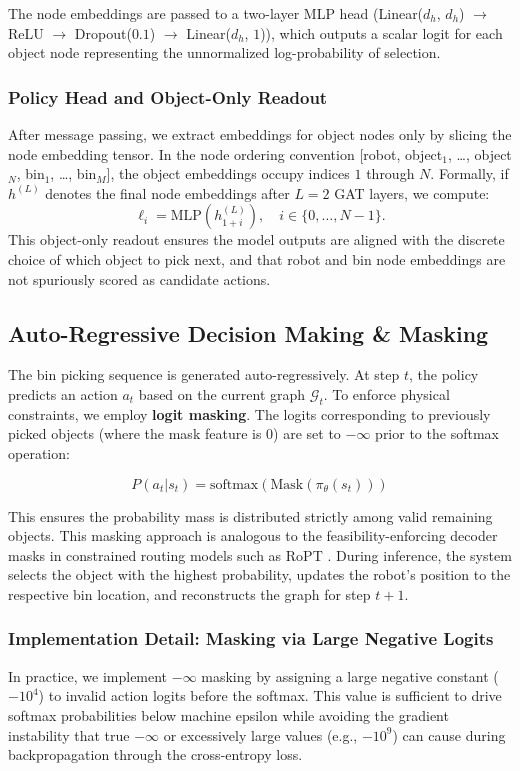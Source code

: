 \documentclass[conference]{IEEEtran}
\begin{document}
The node embeddings are passed to a two-layer MLP head (Linear($d_h$, $d_h$) $\to$ ReLU $\to$ Dropout($0.1$) $\to$ Linear($d_h$, $1$)), which outputs a scalar logit for each object node representing the unnormalized log-probability of selection.

\subsubsection{Policy Head and Object-Only Readout}
After message passing, we extract embeddings for object nodes only by slicing the node embedding tensor. In the node ordering convention [robot, object$_1$, \dots, object$_N$, bin$_1$, \dots, bin$_M$], the object embeddings occupy indices $1$ through $N$.
Formally, if $h^{(L)}$ denotes the final node embeddings after $L{=}2$ GAT layers, we compute:
\begin{equation}
\ell_i = \text{MLP}(h^{(L)}_{1+i}), \quad i \in \{0,\dots,N{-}1\}. 
\end{equation}
This object-only readout ensures the model outputs are aligned with the discrete choice of which object to pick next, and that robot and bin node embeddings are not spuriously scored as candidate actions.

\subsection{Auto-Regressive Decision Making \& Masking}
The bin picking sequence is generated auto-regressively. At step $t$, the policy predicts an action $a_t$ based on the current graph $\mathcal{G}_t$. To enforce physical constraints, we employ \textbf{logit masking}. The logits corresponding to previously picked objects (where the mask feature is $0$) are set to $-\infty$ prior to the softmax operation:

\begin{equation}
    P(a_t | s_t) = \text{softmax}(\text{Mask}(\pi_\theta(s_t)))
\end{equation}

This ensures the probability mass is distributed strictly among valid remaining objects. This masking approach is analogous to the feasibility-enforcing decoder masks in constrained routing models such as RoPT \cite{xiong2025ropt}. During inference, the system selects the object with the highest probability, updates the robot's position to the respective bin location, and reconstructs the graph for step $t+1$.

\subsubsection{Implementation Detail: Masking via Large Negative Logits}
In practice, we implement $-\infty$ masking by assigning a large negative constant ($-10^4$) to invalid action logits before the softmax.
This value is sufficient to drive softmax probabilities below machine epsilon while avoiding the gradient instability that true $-\infty$ or excessively large values (e.g., $-10^9$) can cause during backpropagation through the cross-entropy loss.
\end{document}
